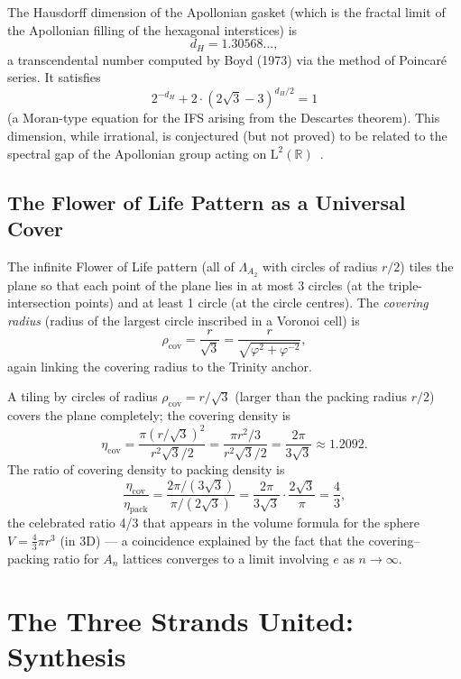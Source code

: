 The Hausdorff dimension of the Apollonian gasket (which is the fractal
limit of the Apollonian filling of the hexagonal interstices) is
\[
  d_H = 1.30568\ldots,
\]
a transcendental number computed by Boyd (1973) via the method of
Poincaré series.  It satisfies
\[
  2^{-d_H} + 2\cdot (2\sqrt{3}-3)^{d_H/2} = 1
\]
(a Moran-type equation for the IFS arising from the Descartes theorem).
This dimension, while irrational, is conjectured (but not proved) to be
related to the spectral gap of the Apollonian group acting on
\(\mathrm{L}^2(\mathbb{R})\)~\cite{conway_sphere_packings}.

\subsection{The Flower of Life Pattern as a Universal Cover}
\label{subsec:fol-universal-cover}

The infinite Flower of Life pattern (all of \(\Lambda_{A_2}\) with circles
of radius \(r/2\)) tiles the plane so that each point of the plane lies
in at most 3 circles (at the triple-intersection points) and at least 1
circle (at the circle centres).  The \emph{covering radius} (radius of
the largest circle inscribed in a Voronoi cell) is
\[
  \rho_{\mathrm{cov}} = \frac{r}{\sqrt{3}} = \frac{r}{\sqrt{\varphi^2+\varphi^{-2}}},
\]
again linking the covering radius to the Trinity anchor.

A tiling by circles of radius \(\rho_{\mathrm{cov}}=r/\sqrt{3}\) (larger
than the packing radius \(r/2\)) covers the plane completely; the covering
density is
\[
  \eta_{\mathrm{cov}} = \frac{\pi(r/\sqrt{3})^2}{r^2\sqrt{3}/2}
  = \frac{\pi r^2/3}{r^2\sqrt{3}/2} = \frac{2\pi}{3\sqrt{3}} \approx 1.2092.
\]
The ratio of covering density to packing density is
\[
  \frac{\eta_{\mathrm{cov}}}{\eta_{\mathrm{pack}}} = \frac{2\pi/(3\sqrt{3})}{\pi/(2\sqrt{3})}
  = \frac{2\pi}{3\sqrt{3}}\cdot\frac{2\sqrt{3}}{\pi}=\frac{4}{3},
\]
the celebrated ratio 4/3 that appears in the volume formula for the sphere
\(V=\frac{4}{3}\pi r^3\) (in 3D) — a coincidence explained by the
fact that the covering–packing ratio for \(A_n\) lattices converges to
a limit involving \(e\) as \(n\to\infty\).

\section{The Three Strands United: Synthesis}
\label{sec:fol-synthesis}

